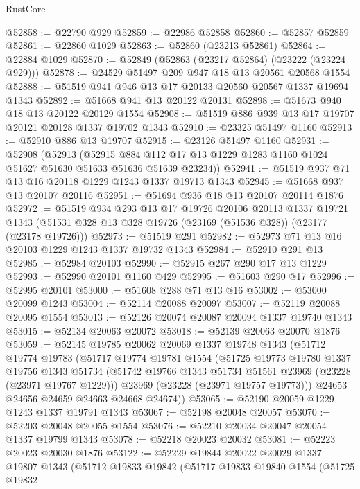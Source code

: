 \begin{lexlean}{RustCore}
\begin{coremodule}
@52858 := @22790 @929
@52859 := @22986 @52858
@52860 := @52857 @52859
@52861 := @22860 @1029
@52863 := @52860 (@23213 @52861)
@52864 := @22884 @1029
@52870 := @52849 (@52863 (@23217 @52864) (@23222 (@23224 @929)))
@52878 := @24529 @51497 @209 @947 @18 @13 @20561 @20568 @1554
@52888 := @51519 @941 @946 @13 @17 @20133 @20560 @20567 @1337 @19694 @1343
@52892 := @51668 @941 @13 @20122 @20131
@52898 := @51673 @940 @18 @13 @20122 @20129 @1554
@52908 := @51519 @886 @939 @13 @17 @19707 @20121 @20128 @1337 @19702 @1343
@52910 := @23325 @51497 @1160
@52913 := @52910 @886 @13 @19707
@52915 := @23126 @51497 @1160
@52931 := @52908
    (@52913
      (@52915 @884 @112 @17 @13 @1229 @1283 @1160 @1024 @51627 @51630 @51633 @51636 @51639 @23234))
@52941 := @51519 @937 @71 @13 @16 @20118 @1229 @1243 @1337 @19713 @1343
@52945 := @51668 @937 @13 @20107 @20116
@52951 := @51694 @936 @18 @13 @20107 @20114 @1876
@52972 := @51519
    @934
    @293
    @13
    @17
    @19726
    @20106
    @20113
    @1337
    @19721
    @1343
    (@51531 @328 @13 @328 @19726 (@23169 (@51536 @328)) (@23177 (@23178 @19726)))
@52973 := @51519 @291
@52982 := @52973 @71 @13 @16 @20103 @1229 @1243 @1337 @19732 @1343
@52984 := @52910 @291 @13
@52985 := @52984 @20103
@52990 := @52915 @267 @290 @17 @13 @1229
@52993 := @52990 @20101 @1160 @429
@52995 := @51603 @290 @17
@52996 := @52995 @20101
@53000 := @51608 @288 @71 @13 @16
@53002 := @53000 @20099 @1243
@53004 := @52114 @20088 @20097
@53007 := @52119 @20088 @20095 @1554
@53013 := @52126 @20074 @20087 @20094 @1337 @19740 @1343
@53015 := @52134 @20063 @20072
@53018 := @52139 @20063 @20070 @1876
@53059 := @52145
    @19785
    @20062
    @20069
    @1337
    @19748
    @1343
    (@51712
      @19774
      @19783
      (@51717
        @19774
        @19781
        @1554
        (@51725
          @19773
          @19780
          @1337
          @19756
          @1343
          @51734
          (@51742 @19766 @1343 @51734 @51561 @23969 (@23228 (@23971 @19767 @1229)))
          @23969
          (@23228 (@23971 @19757 @19773)))
        @24653
        @24656
        @24659
        @24663
        @24668
        @24674))
@53065 := @52190 @20059 @1229 @1243 @1337 @19791 @1343
@53067 := @52198 @20048 @20057
@53070 := @52203 @20048 @20055 @1554
@53076 := @52210 @20034 @20047 @20054 @1337 @19799 @1343
@53078 := @52218 @20023 @20032
@53081 := @52223 @20023 @20030 @1876
@53122 := @52229
    @19844
    @20022
    @20029
    @1337
    @19807
    @1343
    (@51712
      @19833
      @19842
      (@51717
        @19833
        @19840
        @1554
        (@51725
          @19832

\end{coremodule}
\end{lexlean}
